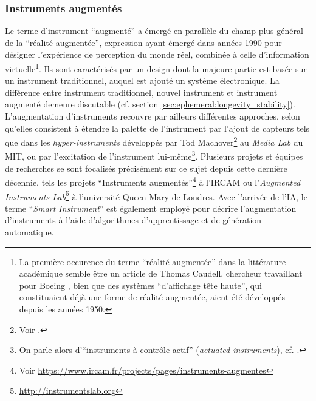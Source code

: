 \subsubsection{Instruments augmentés}

\noindent Le terme d'instrument ``augmenté'' a émergé en parallèle du champ plus général de la ``réalité augmentée'', expression ayant émergé dans années 1990 pour désigner l'expérience de perception du monde réel, combinée à celle d'information virtuelle\footnote{La première occurence du terme ``réalité augmentée'' dans la littérature académique semble être un article de Thomas Caudell, chercheur travaillant pour Boeing \cite{caudell_augmented_1992}, bien que des systèmes ``d'affichage tête haute'', qui constituaient déjà une forme de réalité augmentée, aient été développés depuis les années 1950.}. Ils sont caractérisés par un design dont la majeure partie est basée sur un instrument traditionnel, auquel est ajouté un système électronique. La différence entre instrument traditionnel, nouvel instrument et instrument augmenté demeure discutable (cf. section \ref{sec:ephemeral:longevity_stability}).\\
\indent L'augmentation d'instruments recouvre par ailleurs différentes approches, selon qu'elles consistent à étendre la palette de l'instrument par l'ajout de capteurs tels que dans les \textit{hyper-instruments} développés par Tod Machover\footnote{Voir \cite{machover_hyperinstruments_1991}.} au \textit{Media Lab} du \gls{MIT}, ou par l'excitation de l'instrument lui-même\footnote{On parle alors d'``instruments à contrôle actif'' (\textit{actuated instruments}), cf. \cite{overholt_advancements_2011}.}. Plusieurs projets et équipes de recherches se sont focalisés précisément sur ce sujet depuis cette dernière décennie, tels les projets ``Instruments augmentés''\footnote{Voir \url{https://www.ircam.fr/projects/pages/instruments-augmentes}} à l'\gls{IRCAM} ou l'\textit{Augmented Instruments Lab}\footnote{\url{http://instrumentslab.org}} à l'université Queen Mary de Londres. Avec l'arrivée de l'\gls{IA}, le terme ``\textit{Smart Instrument}'' est également employé pour décrire l'augmentation d'instruments à l'aide d'algorithmes d'apprentissage et de génération automatique.\\ 



